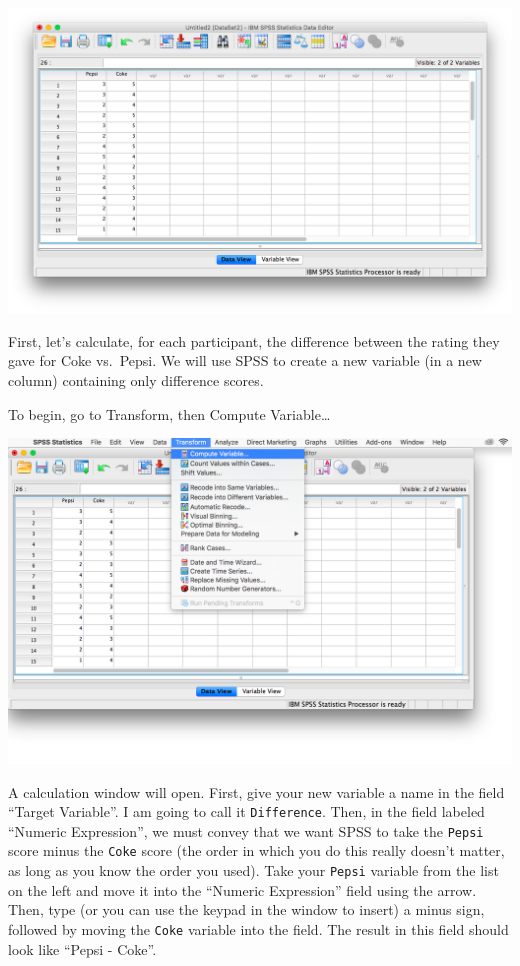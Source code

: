 \documentclass[
]{book}
\begin{document}
\includegraphics{img/5.4.11.png}

First, let's calculate, for each participant, the difference between the rating they gave for Coke vs.~Pepsi. We will use SPSS to create a new variable (in a new column) containing only difference scores.

To begin, go to {Transform}, then {Compute Variable\ldots{}}

\includegraphics{img/5.4.12.png}

A calculation window will open. First, give your new variable a name in the field ``Target Variable''. I am going to call it \texttt{Difference}. Then, in the field labeled ``Numeric Expression'', we must convey that we want SPSS to take the \texttt{Pepsi} score minus the \texttt{Coke} score (the order in which you do this really doesn't matter, as long as you know the order you used). Take your \texttt{Pepsi} variable from the list on the left and move it into the ``Numeric Expression'' field using the arrow. Then, type (or you can use the keypad in the window to insert) a minus sign, followed by moving the \texttt{Coke} variable into the field. The result in this field should look like ``Pepsi - Coke''.
\end{document}
